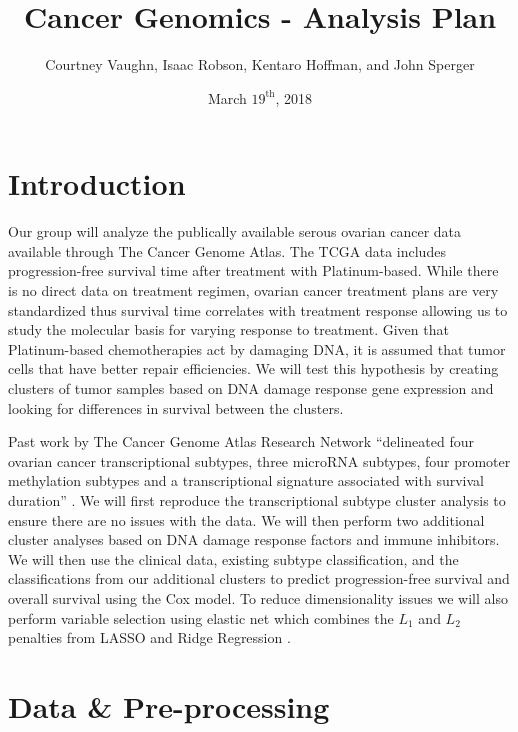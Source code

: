 \documentclass{article}
\author{
Courtney Vaughn, Isaac Robson, Kentaro Hoffman, and John Sperger
}
\title{Cancer Genomics - Analysis Plan}
\date{March $19^{\mathrm{th}}$, 2018}
\begin{document}
\maketitle

\section{Introduction}

  Our group will analyze the publically available serous ovarian cancer data available through The Cancer Genome Atlas. The TCGA data includes progression-free survival time after treatment with Platinum-based. While there is no direct data on treatment regimen, ovarian cancer treatment plans are very standardized thus survival time correlates with treatment response allowing us to study the molecular basis for varying response to treatment. Given that Platinum-based chemotherapies act by damaging DNA, it is assumed that tumor cells that have better repair efficiencies. We will test this hypothesis by creating clusters of tumor samples based on DNA damage response gene expression and looking for differences in survival between the clusters.  
  
   Past work by The Cancer Genome Atlas Research Network ``delineated four ovarian cancer transcriptional subtypes, three microRNA subtypes, four promoter methylation subtypes and a transcriptional signature associated with survival duration'' \cite{cancer2011integrated}. We will first reproduce the transcriptional subtype cluster analysis to ensure there are no issues with the data. We will then perform two additional cluster analyses based on DNA damage response factors and immune inhibitors. We will then use the clinical data, existing subtype classification, and the classifications from our additional clusters to predict progression-free survival and overall survival using the Cox model. To reduce dimensionality issues we will also perform variable selection using elastic net which combines the $L_1$ and $L_2$ penalties from LASSO and Ridge Regression \cite{zou2005regularization}.  

\section{Data \& Pre-processing}

\end{document}
